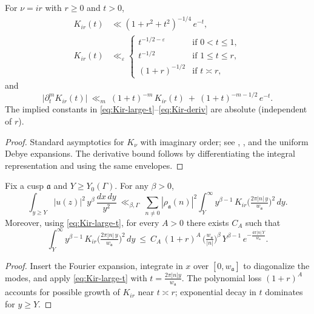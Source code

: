 \begin{lemma}\label{lem:B.7-Kir}
For $\nu=i r$ with $r\ge 0$ and $t>0$,
\begin{align}
K_{i r}(t) &\ll (1+r^2+t^2)^{-1/4}\,e^{-t},\label{eq:Kir-large-t}\\
K_{i r}(t) &\ll_\varepsilon
\begin{cases}
t^{-1/2-\varepsilon} & \text{if } 0<t\le 1,\\[2pt]
t^{-1/2} & \text{if } 1\le t\le r,\\[2pt]
(1+r)^{-1/2} & \text{if } t\asymp r,
\end{cases}\label{eq:Kir-small-t}
\end{align}
and
\begin{equation}\label{eq:Kir-deriv}
\big|\partial_t^m K_{i r}(t)\big| \ \ll_m\ (1+t)^{-m}\,K_{i r}(t)\ +\ (1+t)^{-m-1/2}\,e^{-t}.
\end{equation}
The implied constants in \eqref{eq:Kir-large-t}–\eqref{eq:Kir-deriv} are absolute (independent of $r$).
\end{lemma}

\begin{proof}
Standard asymptotics for $K_\nu$ with imaginary order; see \cite[§10.25]{DLMF},
\cite[§6.20]{Watson}, and the uniform Debye expansions. The derivative bound
follows by differentiating the integral representation and using the same envelopes.
\end{proof}

\begin{proposition}\label{prop:B.7-cusp-tail}
Fix a cusp $\mathfrak a$ and $Y\ge Y_0(\Gamma)$. For any $\beta>0$,
\[
\int_{y\ge Y} |u(z)|^2\, y^{\beta}\, \frac{dx\,dy}{y^2}
\ \ll_{\beta,\Gamma}\ \sum_{n\neq 0} |\rho_{\mathfrak a}(n)|^2
\int_Y^\infty y^{\beta-1}\, K_{i r}\!\Big(\tfrac{2\pi |n|\, y}{w_{\mathfrak a}}\Big)^{\!2}\,dy.
\]
Moreover, using \eqref{eq:Kir-large-t}, for every $A>0$ there exists $C_A$ such that
\[
\int_Y^\infty y^{\beta-1}\, K_{i r}\!\Big(\tfrac{2\pi |n|\, y}{w_{\mathfrak a}}\Big)^{\!2}\,dy
\ \le\ C_A\, (1+r)^{A}\,\Big(\tfrac{w_{\mathfrak a}}{|n|}\Big)^{\beta}\, Y^{\beta-1}\,e^{-\frac{4\pi |n|\, Y}{w_{\mathfrak a}}}.
\]
\end{proposition}

\begin{proof}
Insert the Fourier expansion, integrate in $x$ over $[0,w_{\mathfrak a}]$ to diagonalize the modes,
and apply \eqref{eq:Kir-large-t} with $t=\tfrac{2\pi |n| y}{w_{\mathfrak a}}$. The polynomial loss $(1+r)^A$
accounts for possible growth of $K_{i r}$ near $t\asymp r$; exponential decay in $t$ dominates for
$y\ge Y$.
\end{proof}

